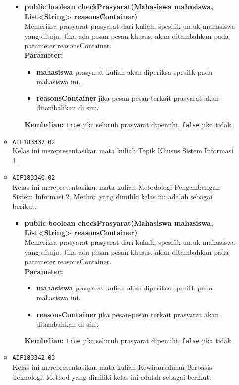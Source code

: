 \begin{enumerate}
\begin{itemize}
		\begin{itemize}
			\item \textbf{public boolean checkPrasyarat(Mahasiswa mahasiswa, List<String> reasonsContainer)}\\
			Memeriksa prasyarat-prasyarat dari kuliah, spesifik untuk mahasiswa yang dituju. Jika ada pesan-pesan khusus, akan ditambahkan pada parameter reasonsContainer.\\
			\textbf{Parameter:}
			\begin{itemize}
				\item \textbf{mahasiswa} prasyarat kuliah akan diperiksa spesifik pada mahasiswa ini.
				\item \textbf{reasonsContainer} jika pesan-pesan terkait prasyarat akan ditambahkan di sini.
			\end{itemize}
			\textbf{Kembalian:} \texttt{true} jika seluruh prasyarat dipenuhi, \texttt{false} jika tidak.
		\end{itemize}
		\item \texttt{AIF183337\_02} \\
		Kelas ini merepresentasikan mata kuliah Topik Khusus Sistem Informasi 1.
		\item \texttt{AIF183340\_02} \\
		Kelas ini merepresentasikan mata kuliah Metodologi Pengembangan Sistem Informasi 2. Method yang dimiliki kelas ini adalah sebagai berikut: 
		\begin{itemize}
			\item \textbf{public boolean checkPrasyarat(Mahasiswa mahasiswa, List<String> reasonsContainer)}\\
			Memeriksa prasyarat-prasyarat dari kuliah, spesifik untuk mahasiswa yang dituju. Jika ada pesan-pesan khusus, akan ditambahkan pada parameter reasonsContainer.\\
			\textbf{Parameter:}
			\begin{itemize}
				\item \textbf{mahasiswa} prasyarat kuliah akan diperiksa spesifik pada mahasiswa ini.
				\item \textbf{reasonsContainer} jika pesan-pesan terkait prasyarat akan ditambahkan di sini.
			\end{itemize}
			\textbf{Kembalian:} \texttt{true} jika seluruh prasyarat dipenuhi, \texttt{false} jika tidak.
		\end{itemize}
		\item \texttt{AIF183342\_03} \\
		Kelas ini merepresentasikan mata kuliah Kewirausahaan Berbasis Teknologi. Method yang dimiliki kelas ini adalah sebagai berikut: 

\end{itemize}
\end{enumerate}

